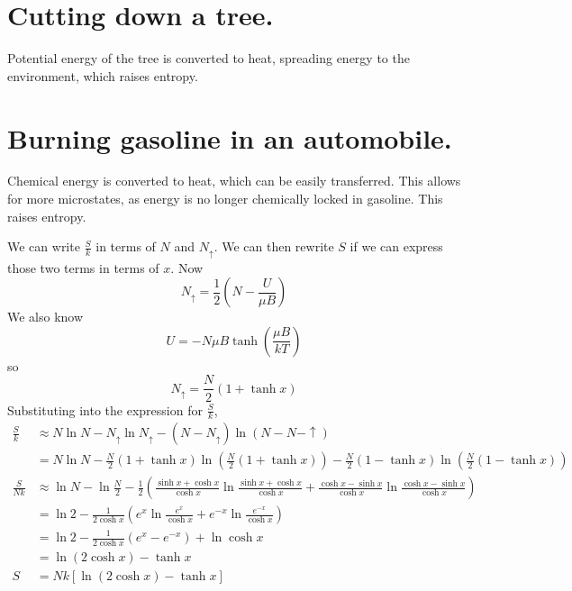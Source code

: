 \documentclass[answers]{exam}
\begin{document}
\begin{questions}
\begin{parts}
    \part{Cutting down a tree.}

    \begin{solution}
        Potential energy of the tree is converted to heat, spreading energy to the environment, which raises entropy.
    \end{solution}

    \part{Burning gasoline in an automobile.}

    \begin{solution}
        Chemical energy is converted to heat, which can be easily transferred. This allows for more microstates, as energy is no longer chemically locked in gasoline. This raises entropy.
    \end{solution}

\end{parts}


\begin{solution}
    We can write $\frac{S}{k}$ in terms of $N$ and $N_\uparrow$. We can then rewrite $S$ if we can express those two terms in terms of $x$. Now
    $$N_\uparrow = \frac{1}{2} \left(N - \frac{U}{\mu B}\right)$$
    We also know
    $$U = -N\mu B\tanh\left(\frac{\mu B}{kT}\right)$$
    so
    $$N_\uparrow = \frac{N}{2} (1 + \tanh x)$$
    Substituting into the expression for $\frac{S}{k}$,
    \begin{align*}
        \frac{S}{k} &\approx N\ln N - N_\uparrow \ln N_\uparrow - (N-N_\uparrow)\ln(N-N-\uparrow) \\
                    &= N\ln N - \frac{N}{2}(1+\tanh x) \ln \left(\frac{N}{2}(1+\tanh x)\right) - \frac{N}{2}(1-\tanh x) \ln\left(\frac{N}{2}(1-\tanh x)\right) \\
        \frac{S}{Nk} &\approx \ln N - \ln \frac{N}{2} - \frac{1}{2} \left(\frac{\sinh x + \cosh x}{\cosh x} \ln \frac{\sinh x + \cosh x}{\cosh x} + \frac{\cosh x - \sinh x}{\cosh x} \ln \frac{\cosh x - \sinh x}{\cosh x}\right) \\
                     &= \ln2 - \frac{1}{2\cosh x}\left(e^x \ln \frac{e^x}{\cosh x} + e^{-x} \ln \frac{e^{-x}}{\cosh x}\right) \\
                     &= \ln2 - \frac{1}{2\cosh x}(e^x - e^{-x}) + \ln \cosh x \\
                     &= \ln(2\cosh x) - \tanh x \\
        S &= Nk[\ln(2\cosh x) - \tanh x]
    \end{align*}


\end{solution}
\end{questions}
\end{document}
